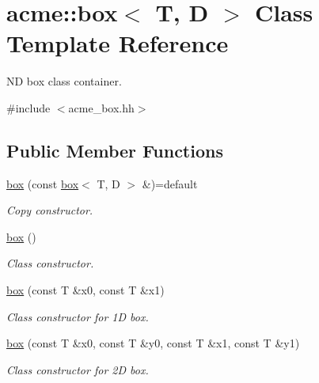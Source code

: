 \hypertarget{classacme_1_1box}{}\section{acme\+:\+:box$<$ T, D $>$ Class Template Reference}
\label{classacme_1_1box}


ND box class container.  




{\ttfamily \#include $<$acme\+\_\+box.\+hh$>$}

\subsection*{Public Member Functions}
\begin{DoxyCompactItemize}
\item 
\mbox{\label{classacme_1_1box_a1a521d455c28d12c1b5204782c5cb4c2}} 
\hyperlink{classacme_1_1box_a1a521d455c28d12c1b5204782c5cb4c2}{box} (const \hyperlink{classacme_1_1box}{box}$<$ T, D $>$ \&)=default
\begin{DoxyCompactList}\small\item\em Copy constructor. \end{DoxyCompactList}\item 
\mbox{\label{classacme_1_1box_ae651a4dcb54d21235e3e04deee263729}} 
\hyperlink{classacme_1_1box_ae651a4dcb54d21235e3e04deee263729}{box} ()
\begin{DoxyCompactList}\small\item\em Class constructor. \end{DoxyCompactList}\item 
\mbox{\label{classacme_1_1box_a495d3da81402ee5ab544de06d18cab66}} 
\hyperlink{classacme_1_1box_a495d3da81402ee5ab544de06d18cab66}{box} (const T \&x0, const T \&x1)
\begin{DoxyCompactList}\small\item\em Class constructor for 1D box. \end{DoxyCompactList}\item 
\mbox{\label{classacme_1_1box_a2e2753881007367b521b15dc9d7d9377}} 
\hyperlink{classacme_1_1box_a2e2753881007367b521b15dc9d7d9377}{box} (const T \&x0, const T \&y0, const T \&x1, const T \&y1)
\begin{DoxyCompactList}\small\item\em Class constructor for 2D box. \end{DoxyCompactList}\item 

\end{DoxyCompactItemize}
